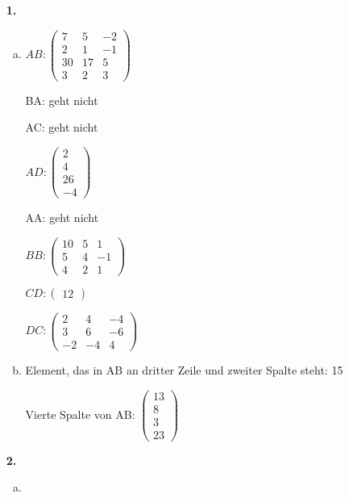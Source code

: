 \documentclass[a4paper]{scrartcl}
\title{\titleinfo}
\author{Elena Noll, Sven-Hendrik Haase, Arne Feil}
\date{\today}
\begin{document}
\maketitle

\begin{enumerate}
\item[\textbf{1.}]
\begin{enumerate}[a)]
\item
$AB:\begin{pmatrix}
7 & 5 & -2 \\
2 & 1 & -1 \\
30 & 17 & 5 \\
3 & 2 & 3
\end{pmatrix}$

BA: geht nicht

AC: geht nicht

$AD:\begin{pmatrix}
2 \\
4 \\
26 \\
-4
\end{pmatrix}$

AA: geht nicht

$BB:\begin{pmatrix}
10 & 5 & 1 \\
5 & 4 & -1 \\
4 & 2 & 1
\end{pmatrix}$

$CD:\begin{pmatrix}
12
\end{pmatrix}$

$DC:\begin{pmatrix}
2 & 4 & -4 \\
3 & 6 & -6 \\
-2 & -4 & 4
\end{pmatrix}$

\item
Element, das in AB an dritter Zeile und zweiter Spalte steht: 15

Vierte Spalte von AB: $\begin{pmatrix}
13 \\
8 \\
3 \\
23
\end{pmatrix}$
\end{enumerate}

\item[\textbf{2.}]
\begin{enumerate}[a)]
\item
\end{enumerate}
\end{enumerate}
\end{document}
